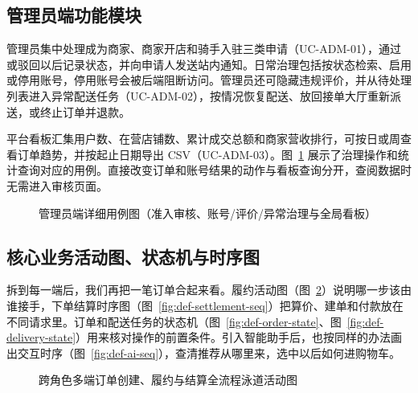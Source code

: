 \subsection{管理员端功能模块}

管理员集中处理成为商家、商家开店和骑手入驻三类申请（UC-ADM-01），通过或驳回以后记录状态，并向申请人发送站内通知。日常治理包括按状态检索、启用或停用账号，停用账号会被后端阻断访问。管理员还可隐藏违规评价，并从待处理列表进入异常配送任务（UC-ADM-02），按情况恢复配送、放回接单大厅重新派送，或终止订单并退款。

平台看板汇集用户数、在营店铺数、累计成交总额和商家营收排行，可按日或周查看订单趋势，并按起止日期导出 CSV（UC-ADM-03）。图~\ref{fig:def-uc-admin} 展示了治理操作和统计查询对应的用例。直接改变订单和账号结果的动作与看板查询分开，查阅数据时无需进入审核页面。

\begin{figure}[!htbp]
  \centering
  \caption{管理员端详细用例图（准入审核、账号/评价/异常治理与全局看板）}\label{fig:def-uc-admin}
\end{figure}

\subsection{核心业务活动图、状态机与时序图}

拆到每一端后，我们再把一笔订单合起来看。履约活动图（图~\ref{fig:def-activity}）说明哪一步该由谁接手，下单结算时序图（图~\ref{fig:def-settlement-seq}）把算价、建单和付款放在不同请求里。订单和配送任务的状态机（图~\ref{fig:def-order-state}、图~\ref{fig:def-delivery-state}）用来核对操作的前置条件。引入智能助手后，也按同样的办法画出交互时序（图~\ref{fig:def-ai-seq}），查清推荐从哪里来，选中以后如何进购物车。

\begin{figure}[!htbp]
  \centering
  \resizebox{!}{.61\textheight}{}
  \caption{跨角色多端订单创建、履约与结算全流程泳道活动图}\label{fig:def-activity}
  \par\smallskip
\end{figure}


